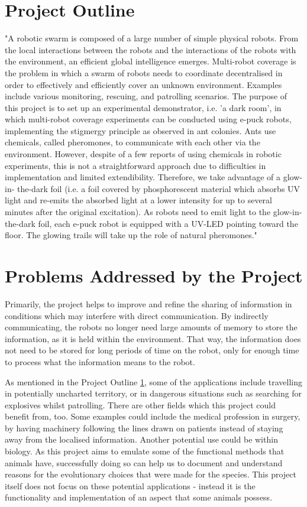 \section{Project Outline} \label{IntroOutline}
"A robotic swarm is composed of a large number of simple physical robots. From
the local interactions between the robots and the interactions of the robots
with the environment, an efficient global intelligence emerges. Multi-robot
coverage is the problem in which a swarm of robots needs to coordinate
decentralised in order to effectively and efficiently cover an unknown
environment. Examples include various monitoring, rescuing, and patrolling
scenarios. The purpose of this project is to set up an experimental
demonstrator, i.e. 'a dark room', in which multi-robot coverage experiments can
be conducted using e-puck robots, implementing the stigmergy principle as
observed in ant colonies. Ants use chemicals, called pheromones, to communicate
with each other via the environment. However, despite of a few reports of using
chemicals in robotic experiments, this is not a straightforward approach due to
difficulties in implementation and limited extendibility. Therefore, we take
advantage of a glow-in- the-dark foil (i.e. a foil covered by phosphorescent
material which absorbs UV light and re-emits the absorbed light at a lower
intensity for up to several minutes after the original excitation). As robots
need to emit light to the glow-in-the-dark foil, each e-puck robot is equipped
with a UV-LED pointing toward the floor. The glowing trails will take up the
role of natural pheromones."

\section{Problems Addressed by the Project} \label{IntroAddressed}
Primarily, the project helps to improve and refine the sharing of information
in conditions which may interfere with direct communication.  By indirectly
communicating, the robots no longer need large amounts of memory to store
the information, as it is held within the environment.  That way, the
information does not need to be stored for long periods of time on the robot,
only for enough time to process what the information means to the robot.

As mentioned in the Project Outline \ref{IntroOutline}, some of the
applications include travelling in potentially uncharted territory, or in
dangerous situations such as searching for explosives whilst patrolling.
There are other fields which this project could benefit from, too.  Some
examples could include the medical profession in surgery, by having machinery
following the lines drawn on patients instead of staying away from the
localised information.  Another potential use could be within biology.  As this
project aims to emulate some of the functional methods that animals have,
successfully doing so can help us to document and understand reasons for the
evolutionary choices that were made for the species.  This project itself does
not focus on these potential applications - instead it is the functionality and
implementation of an aspect that some animals possess.


